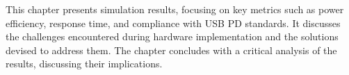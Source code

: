This chapter presents simulation results, focusing on key metrics such as power efficiency, response time, and compliance with USB PD standards. It discusses the challenges encountered during hardware implementation and the solutions devised to address them. The chapter concludes with a critical analysis of the results, discussing their implications.